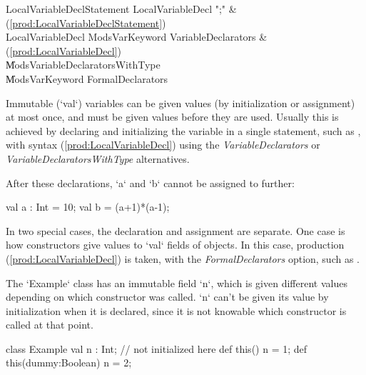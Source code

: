 \begin{bbgrammar}
 LocalVariableDeclStatement    \: LocalVariableDecl \xcd";" & (\ref{prod:LocalVariableDeclStatement})\\%
 LocalVariableDecl    \: Mods\opt VarKeyword VariableDeclarators & (\ref{prod:LocalVariableDecl})\\%
    \| Mods\opt VariableDeclaratorsWithType\\
    \| Mods\opt VarKeyword FormalDeclarators\\
\end{bbgrammar}

Immutable (\xcd`val`) variables can be given values (by initialization or assignment) at
most once, and must be given values before they are used.  Usually this is
achieved by declaring and initializing the variable in a single statement, 
such as , with syntax 
(\ref{prod:LocalVariableDecl}) using the {\it VariableDeclarators} or {\it
VariableDeclaratorsWithType} alternatives.

\begin{ex}
After these declarations, \xcd`a` and \xcd`b` cannot be assigned to further: 
\begin{xten}
val a : Int = 10;
val b = (a+1)*(a-1);
\end{xten}

\end{ex}

In two special cases, the declaration and assignment are separate.  One 
case is how constructors give values to \xcd`val` fields of objects.  In this
case, production (\ref{prod:LocalVariableDecl}) is taken, with the {\it
FormalDeclarators} option, such as  .  

\begin{ex} The
\xcd`Example` class has an immutable field \xcd`n`, which is given different
values depending on which constructor was called. \xcd`n` can't be given its
value by initialization when it is declared, since it is not knowable which
constructor is called at that point.  
\begin{xten}
class Example {
  val n : Int; // not initialized here
  def this() { n = 1; }
  def this(dummy:Boolean) { n = 2;}
}
\end{xten}
%
\end{ex}


